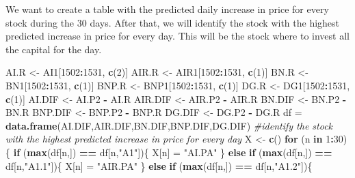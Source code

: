 \documentclass[
  11pt,
]{article}
\newenvironment{Shaded}{\begin{snugshade}}{\end{snugshade}}
\newcommand{\CommentTok}[1]{\textcolor[rgb]{0.56,0.35,0.01}{\textit{#1}}}
\newcommand{\ControlFlowTok}[1]{\textcolor[rgb]{0.13,0.29,0.53}{\textbf{#1}}}
\newcommand{\DecValTok}[1]{\textcolor[rgb]{0.00,0.00,0.81}{#1}}
\newcommand{\KeywordTok}[1]{\textcolor[rgb]{0.13,0.29,0.53}{\textbf{#1}}}
\newcommand{\NormalTok}[1]{#1}
\newcommand{\OperatorTok}[1]{\textcolor[rgb]{0.81,0.36,0.00}{\textbf{#1}}}
\newcommand{\StringTok}[1]{\textcolor[rgb]{0.31,0.60,0.02}{#1}}
\begin{document}
We want to create a table with the predicted daily increase in price for
every stock during the 30 days. After that, we will identify the stock
with the highest predicted increase in price for every day. This will be
the stock where to invest all the capital for the day.

\begin{Shaded}
\begin{Highlighting}[]
\NormalTok{AI.R <-}\StringTok{ }\NormalTok{AI1[}\DecValTok{1502}\OperatorTok{:}\DecValTok{1531}\NormalTok{, }\KeywordTok{c}\NormalTok{(}\DecValTok{2}\NormalTok{)]}
\NormalTok{AIR.R <-}\StringTok{ }\NormalTok{AIR1[}\DecValTok{1502}\OperatorTok{:}\DecValTok{1531}\NormalTok{, }\KeywordTok{c}\NormalTok{(}\DecValTok{1}\NormalTok{)]}
\NormalTok{BN.R <-}\StringTok{ }\NormalTok{BN1[}\DecValTok{1502}\OperatorTok{:}\DecValTok{1531}\NormalTok{, }\KeywordTok{c}\NormalTok{(}\DecValTok{1}\NormalTok{)]}
\NormalTok{BNP.R <-}\StringTok{ }\NormalTok{BNP1[}\DecValTok{1502}\OperatorTok{:}\DecValTok{1531}\NormalTok{, }\KeywordTok{c}\NormalTok{(}\DecValTok{1}\NormalTok{)]}
\NormalTok{DG.R <-}\StringTok{ }\NormalTok{DG1[}\DecValTok{1502}\OperatorTok{:}\DecValTok{1531}\NormalTok{, }\KeywordTok{c}\NormalTok{(}\DecValTok{1}\NormalTok{)]}
\NormalTok{AI.DIF <-}\StringTok{ }\NormalTok{AI.P2 }\OperatorTok{-}\StringTok{ }\NormalTok{AI.R}
\NormalTok{AIR.DIF <-}\StringTok{ }\NormalTok{AIR.P2 }\OperatorTok{-}\StringTok{ }\NormalTok{AIR.R}
\NormalTok{BN.DIF <-}\StringTok{ }\NormalTok{BN.P2 }\OperatorTok{-}\StringTok{ }\NormalTok{BN.R}
\NormalTok{BNP.DIF <-}\StringTok{ }\NormalTok{BNP.P2 }\OperatorTok{-}\StringTok{ }\NormalTok{BNP.R}
\NormalTok{DG.DIF <-}\StringTok{ }\NormalTok{DG.P2 }\OperatorTok{-}\StringTok{ }\NormalTok{DG.R}
\NormalTok{df =}\StringTok{ }\KeywordTok{data.frame}\NormalTok{(AI.DIF,AIR.DIF,BN.DIF,BNP.DIF,DG.DIF)}
\CommentTok{#identify the stock with the highest predicted increase in price for every day}
\NormalTok{X <-}\StringTok{ }\KeywordTok{c}\NormalTok{()}
\ControlFlowTok{for}\NormalTok{ (n }\ControlFlowTok{in} \DecValTok{1}\OperatorTok{:}\DecValTok{30}\NormalTok{)\{}
  \ControlFlowTok{if}\NormalTok{ (}\KeywordTok{max}\NormalTok{(df[n,]) }\OperatorTok{==}\StringTok{ }\NormalTok{df[n,}\StringTok{"A1"}\NormalTok{])\{}
\NormalTok{    X[n] =}\StringTok{ "AI.PA"}
\NormalTok{  \} }\ControlFlowTok{else} \ControlFlowTok{if}\NormalTok{ (}\KeywordTok{max}\NormalTok{(df[n,]) }\OperatorTok{==}\StringTok{ }\NormalTok{df[n,}\StringTok{"A1.1"}\NormalTok{])\{}
\NormalTok{    X[n] =}\StringTok{ "AIR.PA"}
\NormalTok{  \} }\ControlFlowTok{else} \ControlFlowTok{if}\NormalTok{ (}\KeywordTok{max}\NormalTok{(df[n,]) }\OperatorTok{==}\StringTok{ }\NormalTok{df[n,}\StringTok{"A1.2"}\NormalTok{])\{}

\end{Highlighting}
\end{Shaded}
\end{document}
